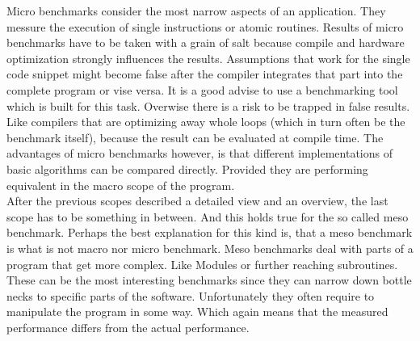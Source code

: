 Micro benchmarks consider the most narrow aspects of an application. They messure the execution of single instructions or atomic routines. Results of micro benchmarks have to be taken with a grain of salt because compile and hardware optimization strongly influences the results. Assumptions that work for the single code snippet might become false after the compiler integrates that part into the complete program or vise versa. It is a good advise to use a benchmarking tool which is built for this task. Overwise there is a risk to be trapped in false results. Like compilers that are optimizing away whole loops (which in turn often be the benchmark itself), because the result can be evaluated at compile time. The advantages of micro benchmarks however, is that different implementations of basic algorithms can be compared directly. Provided they are performing equivalent in the macro scope of the program.\\
After the previous scopes described a detailed view and an overview, the last scope has to be something in between. And this holds true for the so called meso benchmark. Perhaps the best explanation for this kind is, that a meso benchmark is what is not macro nor micro benchmark. Meso benchmarks deal with parts of a program that get more complex. Like Modules or further reaching subroutines. These can be the most interesting benchmarks since they can narrow down bottle necks to specific parts of the software. Unfortunately they often require to manipulate the program in some way. Which again means that the measured performance differs from the actual performance.\\

